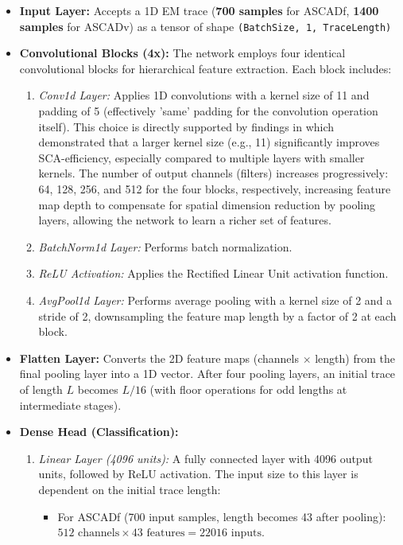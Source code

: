 \documentclass[runningheads]{llncs}
\begin{document}
\begin{itemize}
    \item \textbf{Input Layer:} Accepts a 1D EM trace (\textbf{700 samples} for ASCADf, \textbf{1400 samples} for ASCADv) as a tensor of shape \texttt{(BatchSize, 1, TraceLength)}
    \item \textbf{Convolutional Blocks (4x):} The network employs four identical convolutional blocks for hierarchical feature extraction. Each block includes:
        \begin{enumerate}
            \item \textit{Conv1d Layer:} Applies 1D convolutions with a kernel size of 11 and padding of 5 (effectively 'same' padding for the convolution operation itself). This choice is directly supported by findings in \cite{benadjila2020deep} which demonstrated that a larger kernel size (e.g., 11) significantly improves SCA-efficiency, especially compared to multiple layers with smaller kernels. The number of output channels (filters) increases progressively: 64, 128, 256, and 512 for the four blocks, respectively, increasing feature map depth to compensate for spatial dimension reduction by pooling layers, allowing the network to learn a richer set of features.
            \item \textit{BatchNorm1d Layer:} Performs batch normalization.
            \item \textit{ReLU Activation:} Applies the Rectified Linear Unit activation function.
            \item \textit{AvgPool1d Layer:} Performs average pooling with a kernel size of 2 and a stride of 2, downsampling the feature map length by a factor of 2 at each block.
        \end{enumerate}
    \item \textbf{Flatten Layer:} Converts the 2D feature maps (channels $\times$ length) from the final pooling layer into a 1D vector. After four pooling layers, an initial trace of length $L$ becomes $L/16$ (with floor operations for odd lengths at intermediate stages).
    \item \textbf{Dense Head (Classification):}
        \begin{enumerate}
            \item \textit{Linear Layer (4096 units):} A fully connected layer with 4096 output units, followed by ReLU activation. The input size to this layer is dependent on the initial trace length:
            \begin{itemize}
                \item For ASCADf (700 input samples, length becomes 43 after pooling): $512 \text{ channels} \times 43 \text{ features} = 22016 \text{ inputs}$.

\end{itemize}
\end{enumerate}
\end{itemize}
\end{document}
